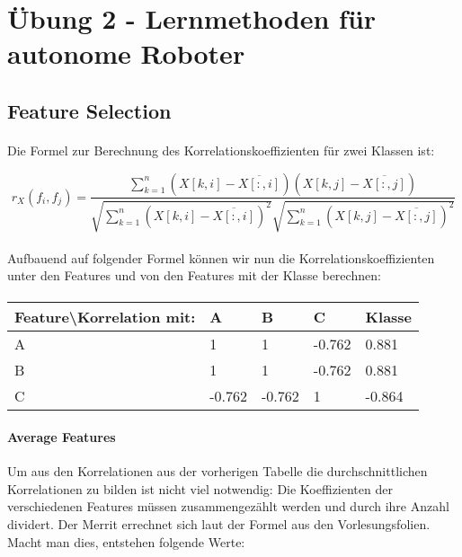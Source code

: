 \documentclass{article}
\begin{document}
\section*{Übung 2 - Lernmethoden für autonome Roboter}
\subsection{Feature Selection}
\paragraph{}
Die Formel zur Berechnung des Korrelationskoeffizienten für zwei Klassen ist:

\[
	r_X(f_i,f_j) = \frac{\sum \limits_{k=1}^{n} (X[k,i] - \overline{X[:,i]})(X[k,j] - \overline{X[:,j]})}{\sqrt{\sum \limits_{k=1}^{n} (X[k,i] - \overline{X[:,i]})^2} \sqrt{\sum \limits_{k=1}^{n} (X[k,j] - \overline{X[:,j]})^2 }}
\]

\paragraph{}
Aufbauend auf folgender Formel können wir nun die Korrelationskoeffizienten unter den Features und von den Features mit der Klasse berechnen:
\paragraph{}
\begin{tabular}{|l|l|l|l|l|}
	\hline
	Feature\textbackslash{}Korrelation mit: & A & B & C & Klasse \\\hline
	A & 1 & 1 & -0.762 & 0.881 \\\hline
	B & 1 & 1 & -0.762 & 0.881 \\\hline
	C & -0.762 & -0.762 & 1 & -0.864 \\\hline
\end{tabular}

\paragraph{Average Features}
Um aus den Korrelationen aus der vorherigen Tabelle die durchschnittlichen Korrelationen zu bilden ist nicht viel notwendig: Die Koeffizienten der verschiedenen Features müssen zusammengezählt werden und durch ihre Anzahl dividert. Der Merrit errechnet sich laut der Formel aus den Vorlesungsfolien. Macht man dies, entstehen folgende Werte:
\end{document}
